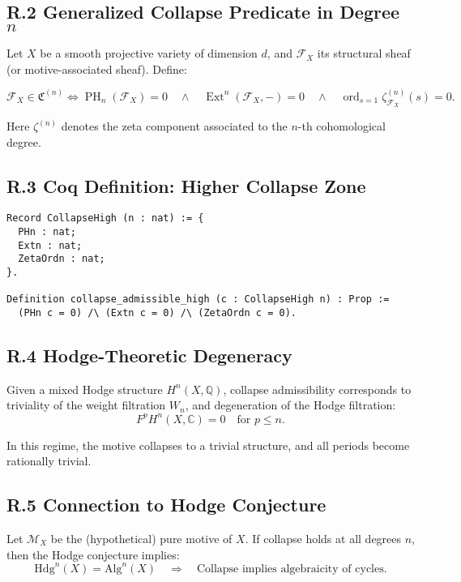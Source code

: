 \documentclass[11pt]{article}
\DeclareMathOperator{\Ext}{Ext}
\DeclareMathOperator{\PH}{PH}
\newcommand{\ord}{\operatorname{ord}}
\begin{document}
\subsection*{R.2 Generalized Collapse Predicate in Degree \( n \)}

Let \( X \) be a smooth projective variety of dimension \( d \), and \( \mathcal{F}_X \) its structural sheaf (or motive-associated sheaf). Define:

\[
\mathcal{F}_X \in \mathfrak{C}^{(n)} \iff 
\PH_n(\mathcal{F}_X) = 0 \quad \land \quad 
\Ext^n(\mathcal{F}_X, -) = 0 \quad \land \quad 
\ord_{s=1} \zeta_{\mathcal{F}_X}^{(n)}(s) = 0.
\]

Here \( \zeta^{(n)} \) denotes the zeta component associated to the \( n \)-th cohomological degree.

\subsection*{R.3 Coq Definition: Higher Collapse Zone}
\begin{lstlisting}[language=Coq]
Record CollapseHigh (n : nat) := {
  PHn : nat;
  Extn : nat;
  ZetaOrdn : nat;
}.

Definition collapse_admissible_high (c : CollapseHigh n) : Prop :=
  (PHn c = 0) /\ (Extn c = 0) /\ (ZetaOrdn c = 0).
\end{lstlisting}

\subsection*{R.4 Hodge-Theoretic Degeneracy}

Given a mixed Hodge structure \( H^n(X, \mathbb{Q}) \), collapse admissibility corresponds to triviality of the weight filtration \( W_n \), and degeneration of the Hodge filtration:
\[
F^p H^n(X, \mathbb{C}) = 0 \quad \text{for } p \leq n.
\]

In this regime, the motive collapses to a trivial structure, and all periods become rationally trivial.

\subsection*{R.5 Connection to Hodge Conjecture}

Let \( \mathcal{M}_X \) be the (hypothetical) pure motive of \( X \). If collapse holds at all degrees \( n \), then the Hodge conjecture implies:
\[
\mathrm{Hdg}^n(X) = \mathrm{Alg}^n(X) \quad \Rightarrow \quad \text{Collapse implies algebraicity of cycles}.
\]
\end{document}
